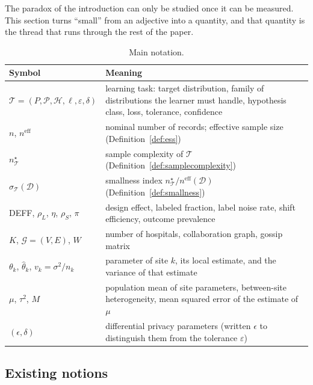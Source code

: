 \documentclass[acmsmall,screen,review]{acmart}
\newcommand{\eff}{\mathrm{eff}}
\theoremstyle{acmdefinition}
\begin{document}
The paradox of the introduction can only be studied once it can be measured. This section turns ``small'' from an adjective into a quantity, and that quantity is the thread that runs through the rest of the paper.

\begin{table}[t]
\caption{Main notation.}
\label{tab:notation}
\small
\begin{tabularx}{\linewidth}{@{}lX@{}}
\toprule
Symbol & Meaning\\
\midrule
$\mathcal{T}=(P,\mathcal{P},\mathcal{H},\ell,\varepsilon,\delta)$ & learning task: target distribution, family of distributions the learner must handle, hypothesis class, loss, tolerance, confidence\\
$n$, $n^{\eff}$ & nominal number of records; effective sample size (Definition~\ref{def:ess})\\
$n^{\star}_{\mathcal{T}}$ & sample complexity of $\mathcal{T}$ (Definition~\ref{def:samplecomplexity})\\
$\sigma_{\mathcal{T}}(\mathcal{D})$ & smallness index $n^{\star}_{\mathcal{T}}/n^{\eff}(\mathcal{D})$ (Definition~\ref{def:smallness})\\
DEFF, $\rho_L$, $\eta$, $\rho_S$, $\pi$ & design effect, labeled fraction, label noise rate, shift efficiency, outcome prevalence\\
$K$, $\mathcal{G}=(V,E)$, $W$ & number of hospitals, collaboration graph, gossip matrix\\
$\theta_k$, $\hat{\theta}_k$, $v_k=\sigma^2/n_k$ & parameter of site $k$, its local estimate, and the variance of that estimate\\
$\mu$, $\tau^2$, $M$ & population mean of site parameters, between-site heterogeneity, mean squared error of the estimate of $\mu$\\
$(\epsilon,\delta)$ & differential privacy parameters (written $\epsilon$ to distinguish them from the tolerance $\varepsilon$)\\
\bottomrule
\end{tabularx}
\end{table}

\subsection{Existing notions}
\end{document}
